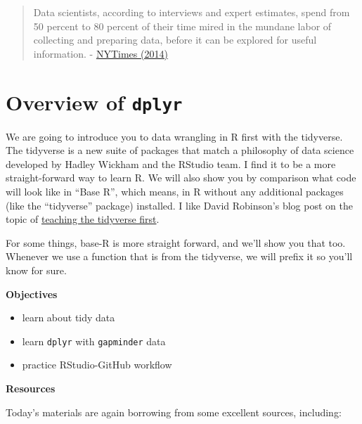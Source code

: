 \documentclass[]{book}
\providecommand{\tightlist}{%
  \setlength{\itemsep}{0pt}\setlength{\parskip}{0pt}}
\theoremstyle{definition}
\theoremstyle{definition}
\theoremstyle{definition}
\theoremstyle{remark}
\begin{document}
\begin{quote}
Data scientists, according to interviews and expert estimates, spend
from 50 percent to 80 percent of their time mired in the mundane labor
of collecting and preparing data, before it can be explored for useful
information. -
\href{http://www.nytimes.com/2014/08/18/technology/for-big-data-scientists-hurdle-to-insights-is-janitor-work.html}{NYTimes
(2014)}
\end{quote}

\section{\texorpdfstring{Overview of
\texttt{dplyr}}{Overview of dplyr}}\label{overview-of-dplyr}

We are going to introduce you to data wrangling in R first with the
tidyverse. The tidyverse is a new suite of packages that match a
philosophy of data science developed by Hadley Wickham and the RStudio
team. I find it to be a more straight-forward way to learn R. We will
also show you by comparison what code will look like in ``Base R'',
which means, in R without any additional packages (like the
``tidyverse'' package) installed. I like David Robinson's blog post on
the topic of
\href{http://varianceexplained.org/r/teach-hard-way}{teaching the
tidyverse first}.

For some things, base-R is more straight forward, and we'll show you
that too. Whenever we use a function that is from the tidyverse, we will
prefix it so you'll know for sure.

\textbf{Objectives}

\begin{itemize}
\tightlist
\item
  learn about tidy data
\item
  learn \texttt{dplyr} with \texttt{gapminder} data
\item
  practice RStudio-GitHub workflow
\end{itemize}

\textbf{Resources}

Today's materials are again borrowing from some excellent sources,
including:
\end{document}
